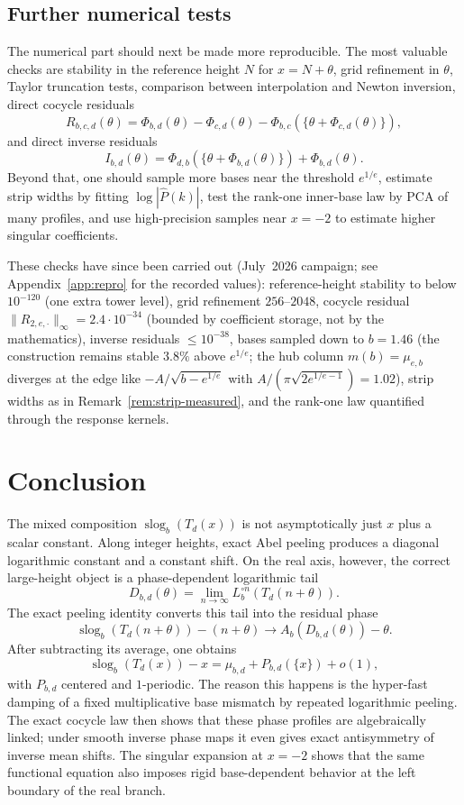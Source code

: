\documentclass[11pt,a4paper]{article}
\theoremstyle{plain}
\theoremstyle{definition}
\theoremstyle{remark}
\newcommand{\slog}{\operatorname{slog}}
\begin{document}
\subsection{Further numerical tests}

The numerical part should next be made more reproducible.  The most valuable checks are stability in the reference height $N$ for $x=N+\theta$, grid refinement in $\theta$, Taylor truncation tests, comparison between interpolation and Newton inversion, direct cocycle residuals
\[
  R_{b,c,d}(\theta)=\Phi_{b,d}(\theta)-\Phi_{c,d}(\theta)-\Phi_{b,c}(\{\theta+\Phi_{c,d}(\theta)\}),
\]
and direct inverse residuals
\[
  I_{b,d}(\theta)=\Phi_{d,b}(\{\theta+\Phi_{b,d}(\theta)\})+\Phi_{b,d}(\theta).
\]
Beyond that, one should sample more bases near the threshold $e^{1/e}$, estimate strip widths by fitting $\log|\widehat P(k)|$, test the rank-one inner-base law by PCA of many profiles, and use high-precision samples near $x=-2$ to estimate higher singular coefficients.

These checks have since been carried out (July~2026 campaign; see
Appendix~\ref{app:repro} for the recorded values): reference-height
stability to below $10^{-120}$ (one extra tower level), grid refinement
$256$--$2048$, cocycle residual $\|R_{2,e,\cdot}\|_\infty=2.4\cdot10^{-34}$
(bounded by coefficient storage, not by the mathematics), inverse residuals
$\le10^{-38}$, bases sampled down to $b=1.46$ (the construction remains
stable $3.8\%$ above $e^{1/e}$; the hub column $m(b)=\mu_{e,b}$ diverges at
the edge like $-A/\sqrt{b-e^{1/e}}$ with $A/(\pi\sqrt{2e^{1/e-1}})=1.02$),
strip widths as in Remark~\ref{rem:strip-measured}, and the rank-one law
quantified through the response kernels.

\section{Conclusion}

The mixed composition $\slog_b(T_d(x))$ is not asymptotically just $x$ plus a scalar constant.  Along integer heights, exact Abel peeling produces a diagonal logarithmic constant and a constant shift.  On the real axis, however, the correct large-height object is a phase-dependent logarithmic tail
\[
  D_{b,d}(\theta)=\lim_{n\to\infty}L_b^{\circ n}(T_d(n+\theta)).
\]
The exact peeling identity converts this tail into the residual phase
\[
  \slog_b(T_d(n+\theta))-(n+\theta)\to A_b(D_{b,d}(\theta))-\theta.
\]
After subtracting its average, one obtains
\[
  \slog_b(T_d(x))-x=\mu_{b,d}+P_{b,d}(\{x\})+o(1),
\]
with $P_{b,d}$ centered and $1$-periodic.  The reason this happens is the hyper-fast damping of a fixed multiplicative base mismatch by repeated logarithmic peeling.  The exact cocycle law then shows that these phase profiles are algebraically linked; under smooth inverse phase maps it even gives exact antisymmetry of inverse mean shifts.  The singular expansion at $x=-2$ shows that the same functional equation also imposes rigid base-dependent behavior at the left boundary of the real branch.
\end{document}
